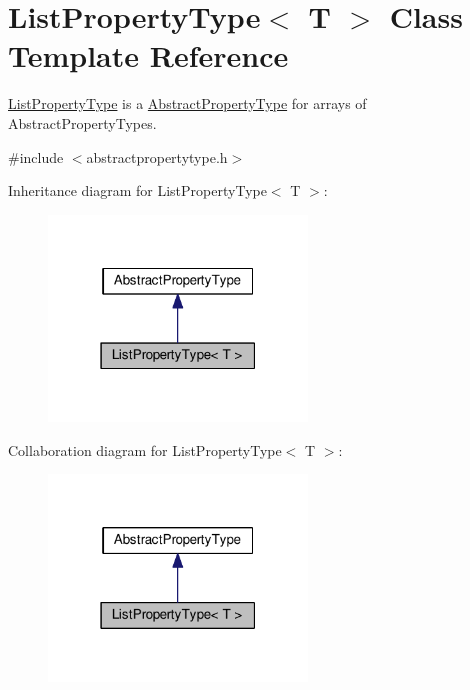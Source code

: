 \hypertarget{classListPropertyType}{\section{List\+Property\+Type$<$ T $>$ Class Template Reference}
\label{classListPropertyType}
}


\hyperlink{classListPropertyType}{List\+Property\+Type} is a \hyperlink{classAbstractPropertyType}{Abstract\+Property\+Type} for arrays of Abstract\+Property\+Types.  




{\ttfamily \#include $<$abstractpropertytype.\+h$>$}



Inheritance diagram for List\+Property\+Type$<$ T $>$\+:\nopagebreak
\begin{figure}[H]
\begin{center}
\leavevmode
\includegraphics[width=195pt]{classListPropertyType__inherit__graph}
\end{center}
\end{figure}


Collaboration diagram for List\+Property\+Type$<$ T $>$\+:\nopagebreak
\begin{figure}[H]
\begin{center}
\leavevmode
\includegraphics[width=195pt]{classListPropertyType__coll__graph}
\end{center}
\end{figure}
